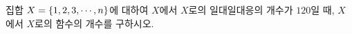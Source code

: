 집합 $X=\{1{,}\mkern3mu\mathopen{}2{,}\mkern3mu\mathopen{}3{,}\mkern3mu\mathopen{}\cdots{,}\mkern3mu\mathopen{}n\}$에 대하여 $X$에서 $X$로의 일대일대응의 개수가 $120$일 때, $X$에서 $X$로의 함수의 개수를 구하시오. 
